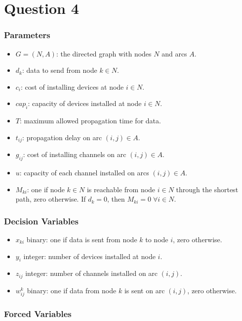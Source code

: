 \section{Question 4}

\subsubsection*{Parameters}

\begin{itemize}
	\item $G = (N, A)$: the directed graph with nodes $N$ and arcs $A$.
	\item $d_k$: data to send from node $k \in N$.
	\item $c_i$: cost of installing devices at node $i \in N$.
	\item $cap_i$: capacity of devices installed at node $i \in N$.
	\item $T$: maximum allowed propagation time for data.
	\item $t_{ij}$: propagation delay on arc $(i, j) \in A$.
	\item $g_{ij}$: cost of installing channels on arc $(i, j) \in A$.
	\item $u$: capacity of each channel installed on arcs $(i, j) \in A$.
	\item $M_{ki}$: one if node $k \in N$ is reachable from node $i \in N$ through the shortest path, zero otherwise. If $d_k = 0$, then $M_{ki} = 0 \; \forall i \in N$.
\end{itemize}

\subsubsection*{Decision Variables}

\begin{itemize}
	\item $x_{ki}$ binary: one if data is sent from node $k$ to node $i$, zero otherwise.
	\item $y_i$ integer: number of devices installed at node $i$.
	\item $z_{ij}$ integer: number of channels installed on arc $(i, j)$.
	\item $w_{ij}^k$ binary: one if data from node $k$ is sent on arc $(i, j)$, zero otherwise.
\end{itemize}

\subsubsection*{Forced Variables}

